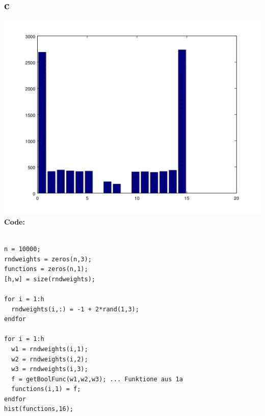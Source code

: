 \documentclass[a4paper,10pt]{article}
\begin{document}
\subsection*{c}
	\includegraphics[scale=0.5]{boolfunctions.png}\\
	\textbf{Code:}\\
	\begin{lstlisting}

n = 10000;
rndweights = zeros(n,3);
functions = zeros(n,1);
[h,w] = size(rndweights);

for i = 1:h
  rndweights(i,:) = -1 + 2*rand(1,3);
endfor

for i = 1:h
  w1 = rndweights(i,1);
  w2 = rndweights(i,2);
  w3 = rndweights(i,3);
  f = getBoolFunc(w1,w2,w3); ... Funktione aus 1a
  functions(i,1) = f;
endfor
hist(functions,16);
	\end{lstlisting}
\end{document}
